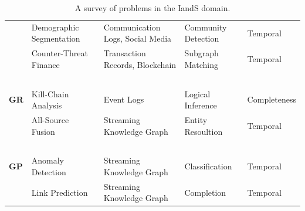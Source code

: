 \begin{table}[t]
\begin{center}
{\begin{tabular}{lllll}
                                                            & Demographic Segmentation~\cite{Army2023,Zachary1977,Sobolevsky2014}            & Communication Logs, Social Media  & Community Detection      & Temporal     \\
                                                            & Counter-Threat Finance~\cite{Keene2014,Balaskas2018,Goldsmith2020,Michalak2011,Soltani2016}              & Transaction Records, Blockchain   & Subgraph Matching        & Temporal     \\
                                ~                           &                   ~                 &                 ~                 &                 ~             &          ~            \\
                \textbf{\acs{GR}}                          & Kill-Chain Analysis~\cite{Tradoc2007,Hutchins2011,Sadlek2022,Osullivan2015}                & Event Logs                       & Logical Inference  & Completeness    \\
                                                            & All-Source Fusion~\cite{Army2019,Regli2022a,Szekely2015}                   & Streaming Knowledge Graph         & Entity Resoultion  & Temporal   \\
                                ~                           &           ~                         &                 ~                 &                 ~             &             ~         \\
                \textbf{\acs{GP}}                         & Anomaly Detection~\cite{Wu2021,Ren2023}                   & Streaming Knowledge Graph         & Classification    & Temporal   \\
                                                            & Link Prediction~\cite{Granovetter1973,Carmody2022,Bangerter2022, Ahmadi2023}                     & Streaming Knowledge Graph         & Completion        & Temporal   \\
    

            \end{tabular}
        \caption{A survey of \gai problems in the {\ac{IandS}} domain.} 
        \label{Table:problem-survey}
        }
        \end{center}
    \end{table}
